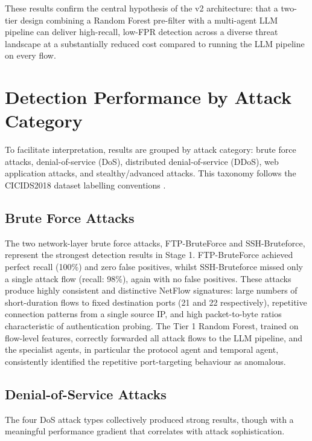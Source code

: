 These results confirm the central hypothesis of the v2 architecture: that a two-tier design combining a Random Forest pre-filter with a multi-agent LLM pipeline can deliver high-recall, low-FPR detection across a diverse threat landscape at a substantially reduced cost compared to running the LLM pipeline on every flow.

\section{Detection Performance by Attack Category}
\label{sec:detection-by-category}

To facilitate interpretation, results are grouped by attack category: brute force attacks, denial-of-service (DoS), distributed denial-of-service (DDoS), web application attacks, and stealthy/advanced attacks. This taxonomy follows the CICIDS2018 dataset labelling conventions \autocite{Sharafaldin2018}.

\subsection{Brute Force Attacks}
\label{sec:brute-force}

The two network-layer brute force attacks, FTP-BruteForce and SSH-Bruteforce, represent the strongest detection results in Stage 1. FTP-BruteForce achieved perfect recall (100\%) and zero false positives, whilst SSH-Bruteforce missed only a single attack flow (recall: 98\%), again with no false positives. These attacks produce highly consistent and distinctive NetFlow signatures: large numbers of short-duration flows to fixed destination ports (21 and 22 respectively), repetitive connection patterns from a single source IP, and high packet-to-byte ratios characteristic of authentication probing. The Tier 1 Random Forest, trained on flow-level features, correctly forwarded all attack flows to the LLM pipeline, and the specialist agents, in particular the protocol agent and temporal agent, consistently identified the repetitive port-targeting behaviour as anomalous.

\subsection{Denial-of-Service Attacks}
\label{sec:dos-attacks}

The four DoS attack types collectively produced strong results, though with a meaningful performance gradient that correlates with attack sophistication.

